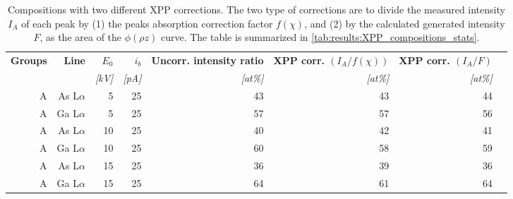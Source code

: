 \begin{table}[phtb]
    \begin{center}
        \caption{
            Compositions with two different XPP corrections.
            The two type of corrections are to divide the measured intensity $I_A$ of each peak  by (1) the peaks absorption correction factor $f(\chi)$, and (2) by the calculated generated intensity $F$, as the area of the $\phi(\rho z)$ curve.
            The table is summarized in \cref{tab:results:XPP_compositions_stats}.
        }
        \label{tab:results:XPP_compositions}
        \begin{tabular}{rrrrrrrr}
            \hline
            \textbf{Groups} & \textbf{Line} & \textbf{$E_0$} & \textbf{$i_b$} & \textbf{Uncorr. intensity ratio} & \textbf{XPP corr. $(I_A/f(\chi))$} & \textbf{XPP corr. $(I_A/F)$} \\
            \emph{}         & \emph{}       & \emph{[kV]}    & \emph{[pA]}    & \emph{[at\%]}                    & \emph{[at\%]}                      & \emph{[at\%]}                \\
            \hline
            A               & As L$\alpha$  & 5              & 25             & 43                               & 43                                 & 44                           \\
            A               & Ga L$\alpha$  & 5              & 25             & 57                               & 57                                 & 56                           \\
            A               & As L$\alpha$  & 10             & 25             & 40                               & 42                                 & 41                           \\
            A               & Ga L$\alpha$  & 10             & 25             & 60                               & 58                                 & 59                           \\
            A               & As L$\alpha$  & 15             & 25             & 36                               & 39                                 & 36                           \\
            A               & Ga L$\alpha$  & 15             & 25             & 64                               & 61                                 & 64                           \\

\end{tabular}
\end{center}
\end{table}

